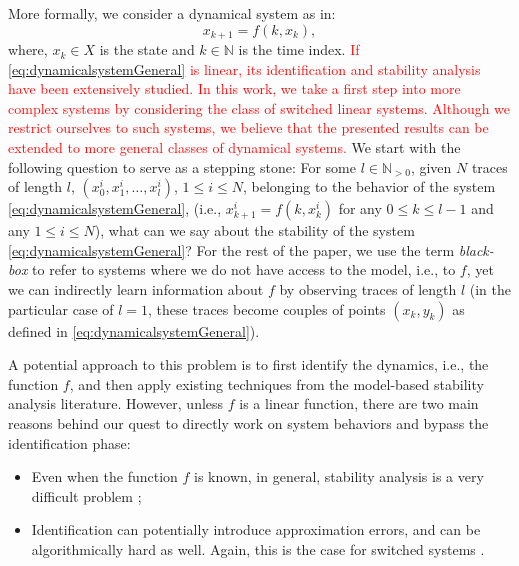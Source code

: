 More formally, we consider a dynamical system as in:
\vspace{-0.88394mm}
\begin{equation}\label{eq:dynamicalsystemGeneral}
x_{k+1} = f(k, x_k),
\end{equation}
where, $x_k \in X$ is the state and $k \in \mathbb{N}$ is the time index. 
\textcolor{red}{If \eqref{eq:dynamicalsystemGeneral} is linear, its identification and stability analysis have been extensively studied. In this work, we take a first step into more complex systems by considering the class of switched linear systems. Although we restrict ourselves to such systems, we believe that the presented results can be extended to more general classes of dynamical systems.} 
We start with the following question to serve as a stepping stone: For some $l \in \mathbb{N}_{>0}$, given $N$ traces of length $l$, $(x_0^i,x_1^i,\dots, x_l^i)$, $1 \leq i \leq N$, belonging to the behavior of the system \eqref{eq:dynamicalsystemGeneral}, (i.e., $x_{k+1}^i = f(k, x_k^i)$ for any $0 \leq k \leq l-1$ and any $1 \leq i \leq N$), what can we say about the stability of the system \eqref{eq:dynamicalsystemGeneral}? For the rest of the paper, we use the term \emph{black-box} to refer to systems where we do not have access to the model, i.e., to $f$, yet we can indirectly learn information about $f$ by observing traces of length $l$ (in the particular case of $l=1$, these traces become couples of points $(x_k, y_k)$ as defined in \eqref{eq:dynamicalsystemGeneral}).

A potential approach to this problem is to first identify the dynamics, i.e., the function $f$, and then apply existing techniques from the model-based stability analysis literature. However, unless $f$ is a linear function, there are two main reasons behind our quest to directly work on system behaviors and bypass the identification phase: 
\begin{itemize}
\item Even when the function $f$ is known, in general, stability analysis is a very difficult problem \cite{stabilityHard1}; 
\item Identification can potentially introduce approximation errors, and can be algorithmically hard as well. Again, this is the case for switched systems \cite{lauer}. 
\end{itemize}

